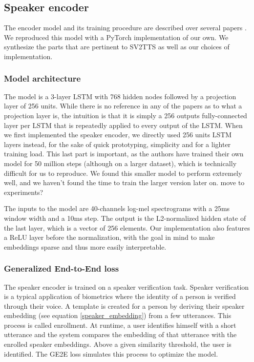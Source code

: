 \documentclass[a4paper, oneside, 12pt, english]{article}
\begin{document}
\subsection{Speaker encoder} \label{speaker_encoder}
The encoder model and its training procedure are described over several papers \citep{SV2TTS, GE2E, TE2E}. We reproduced this model with a PyTorch implementation of our own. We synthesize the parts that are pertinent to SV2TTS as well as our choices of implementation.

\subsubsection{Model architecture}
The model is a 3-layer LSTM with 768 hidden nodes followed by a projection layer of 256 units. While there is no reference in any of the papers as to what a projection layer is, the intuition is that it is simply a 256 outputs fully-connected layer per LSTM that is repeatedly applied to every output of the LSTM. When we first implemented the speaker encoder, we directly used 256 units LSTM layers instead, for the sake of quick prototyping, simplicity and for a lighter training load. This last part is important, as the authors have trained their own model for 50 million steps (although on a larger dataset), which is technically difficult for us to reproduce. We found this smaller model to perform extremely well, and we haven't found the time to train the larger version later on. \color{red} move to experiments? \color{black}

The inputs to the model are 40-channels log-mel spectrograms with a 25ms window width and a 10ms step. The output is the L2-normalized hidden state of the last layer, which is a vector of 256 elements. Our implementation also features a ReLU layer before the normalization, with the goal in mind to make embeddings sparse and thus more easily interpretable.

\subsubsection{Generalized End-to-End loss}
The speaker encoder is trained on a speaker verification task. Speaker verification is a typical application of biometrics where the identity of a person is verified through their voice. A template is created for a person by deriving their speaker embedding (see equation \ref{speaker_embedding}) from a few utterances. This process is called enrollment. At runtime, a user identifies himself with a short utterance and the system compares the embedding of that utterance with the enrolled speaker embeddings. Above a given similarity threshold, the user is identified. The GE2E loss simulates this process to optimize the model. 
\end{document}
